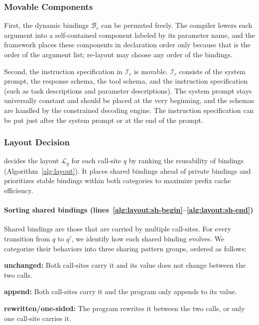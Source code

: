 \subsubsection{Movable Components}
First, the dynamic bindings $\mathcal{B}_c$ can be permuted freely. The compiler lowers each argument into a self-contained component labeled by its parameter name, and the framework places these components in declaration order only because that is the order of the argument list; re-layout may choose any order of the bindings.

Second, the instruction specification in $\mathcal{I}_c$ is movable. $\mathcal{I}_c$ consists of the system prompt, the response schema, the tool schema, and the instruction specification (such as task descriptions and parameter descriptions). The system prompt stays universally constant and should be placed at the very beginning, and the schemas are handled by the constrained decoding engine. The instruction specification can be put just after the system prompt or at the end of the prompt.

\subsubsection{Layout Decision}
\label{sec:layout_decision}

\sysname decides the layout $\mathcal{L}_q$ for each call-site $q$ by ranking the reusability of bindings (Algorithm~\ref{alg:layout}). It places shared bindings ahead of private bindings and prioritizes stable bindings within both categories to maximize prefix cache efficiency. 

\paragraph{Sorting shared bindings {\normalfont(lines~\ref{alg:layout:sh-begin}--\ref{alg:layout:sh-end})}} Shared bindings are those that are carried by multiple call-sites. For every transition from $q$ to $q'$, we identify how each shared binding evolves. We categorize their behaviors into three sharing pattern groups, ordered as follows:
\begin{enumerate*}[label=(\textbf{\roman*})]
    \item \textbf{unchanged:} Both call-sites carry it and its value does not change between the two calls.
    \item \textbf{append:} Both call-sites carry it and the program only appends to its value.
    \item \textbf{rewritten/one-sided:} The program rewrites it between the two calls, or only one call-site carries it.
\end{enumerate*}

